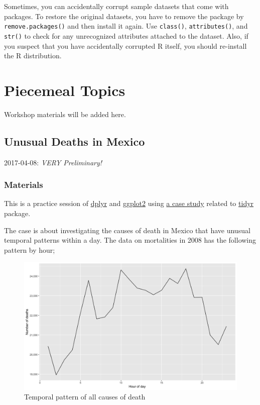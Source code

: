 \documentclass[]{book}
\theoremstyle{definition}
\theoremstyle{definition}
\theoremstyle{remark}
\begin{document}
Sometimes, you can accidentally corrupt sample datasets that come with
packages. To restore the original datasets, you have to remove the
package by \texttt{remove.packages()} and then install it again. Use
\texttt{class()}, \texttt{attributes()}, and \texttt{str()} to check for
any unrecognized attributes attached to the dataset. Also, if you
suspect that you have accidentally corrupted R itself, you should
re-install the R distribution.

\chapter{Piecemeal Topics}\label{piecemeal-top}

Workshop materials will be added here.

\section{Unusual Deaths in Mexico}\label{dplyr}

2017-04-08: {\emph{VERY Preliminary!}}

\subsection*{Materials}\label{materials-1}

This is a practice session of
\href{http://docs.ggplot2.org/current/}{dplyr} and
\href{http://docs.ggplot2.org/current/}{ggplot2} using
\href{http://vita.had.co.nz/papers/tidy-data.html}{a case study} related
to
\href{https://www.r-bloggers.com/data-manipulation-with-tidyr/}{tidyr}
package.

The case is about investigating the causes of death in Mexico that have
unusual temporal patterns within a day. The data on mortalities in 2008
has the following pattern by hour;

\begin{figure}

{\centering \includegraphics[width=0.9\linewidth]{tidy_case_study/overall} 

}

\caption{Temporal pattern of all causes of death}\label{fig:unnamed-chunk-2}
\end{figure}
\end{document}

